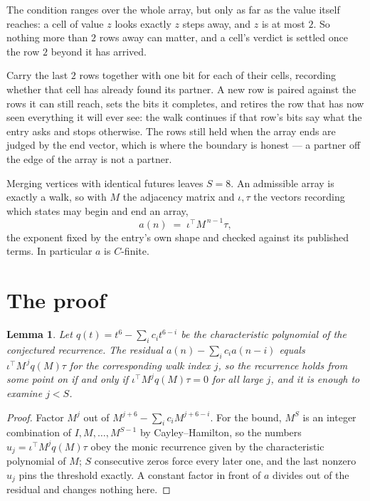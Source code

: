 \documentclass[11pt,a4paper]{article}
\theoremstyle{plain}
\newtheorem{lemma}[theorem]{Lemma}
\theoremstyle{definition}
\begin{document}
The condition ranges over the whole array, but only as far as the value itself reaches: a cell of value $z$ looks exactly $z$ steps away, and $z$ is at most $2$. So nothing more than $2$ rows away can matter, and a cell's verdict is settled once the row $2$ beyond it has arrived.

Carry the last $2$ rows together with one bit for each of their cells, recording whether that cell has already found its partner. A new row is paired against the rows it can still reach, sets the bits it completes, and retires the row that has now seen everything it will ever see: the walk continues if that row's bits say what the entry asks and stops otherwise. The rows still held when the array ends are judged by the end vector, which is where the boundary is honest --- a partner off the edge of the array is not a partner.

Merging vertices with identical futures leaves $S=8$. An admissible array is exactly a walk, so with $M$ the adjacency matrix and $\iota,\tau$ the vectors recording which states may begin and end an array,
\[
a(n)\;=\;\iota^{\!\top}M^{\,n-1}\tau ,
\]
the exponent fixed by the entry's own shape and checked against its published terms. In
particular $a$ is $C$-finite.

\section{The proof}

\begin{lemma}\label{lem:crit}
Let $q(t)=t^{6}-\sum_i c_it^{6-i}$ be the characteristic polynomial of the
conjectured recurrence. The residual $a(n)-\sum_ic_ia(n-i)$ equals
$\iota^{\!\top}M^{\,j}q(M)\tau$ for the corresponding walk index $j$, so the recurrence
holds from some point on if and only if $\iota^{\!\top}M^{j}q(M)\tau=0$ for all large $j$,
and it is enough to examine $j<S$.
\end{lemma}

\begin{proof}
Factor $M^{j}$ out of $M^{j+6}-\sum_ic_iM^{j+6-i}$. For the bound, $M^{S}$
is an integer combination of $I,M,\dots,M^{S-1}$ by Cayley--Hamilton, so the numbers
$u_j=\iota^{\!\top}M^{j}q(M)\tau$ obey the monic recurrence given by the characteristic
polynomial of $M$; $S$ consecutive zeros force every later one, and the last nonzero $u_j$
pins the threshold exactly. A constant factor in front of $a$ divides out of the residual and
changes nothing here.
\end{proof}
\end{document}
